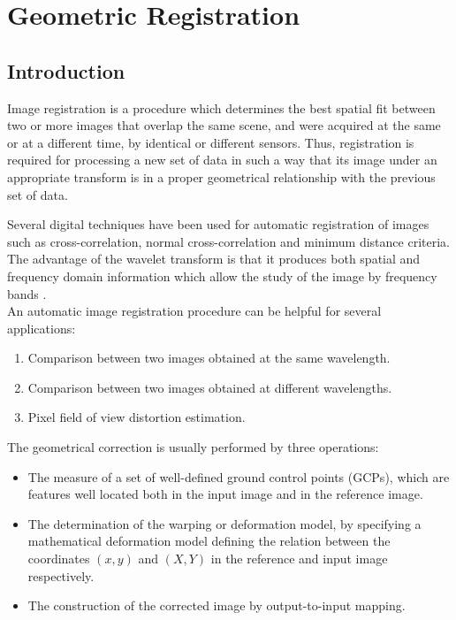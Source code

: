 \chapter{\proj Geometric Registration}
\label{ch_register}

\section{Introduction}
Image registration is a procedure which determines 
the best spatial fit between two or more images that overlap the same 
scene, and were acquired at the same or at a different time, by identical or 
different sensors. 
Thus, registration is required for  processing a new set of data 
in such a way that its 
image under an appropriate transform is in a proper geometrical 
relationship with the previous set of data. 
\bigskip

Several digital techniques have been used for automatic registration of 
images such as cross-correlation, normal cross-correlation and minimum 
distance criteria.  
The advantage of the wavelet transform is that it produces both 
spatial and frequency domain information which allow the study of 
the image by frequency bands \cite{reg:djamdji1,reg:djamdji2,reg:djamdji3}. \\
 
An automatic image registration procedure can be helpful for several
applications:
\begin{enumerate}
\item Comparison between two images obtained at the same wavelength.
\item Comparison between two images obtained at different wavelengths.
\item Pixel field of view distortion estimation.
\end{enumerate}
 \bigskip
 
The geometrical correction is usually performed by three operations:
\begin{itemize}
\item The measure of a set of well-defined ground control points (GCPs), which are 
      features well located both in the input image and in the reference image.
\item The determination of the warping or deformation model, by specifying a 
      mathematical deformation model defining the relation between the 
      coordinates $(x,y)$ and $(X,Y)$ in the reference and input image respectively.
\item The construction of the corrected image by output-to-input mapping.
\end{itemize}

